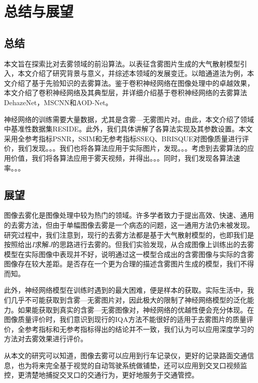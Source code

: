 \documentclass[a4paper, 12pt, oneside]{report}
\begin{document}
{\chapter{总结与展望\quad}
\section{总结\quad}
本文旨在探索比对去雾领域的前沿算法。以表征含雾图片生成的大气散射模型引入，本文介绍了研究背景与意义，并综述本领域的发展变迁。以暗通道法为例，本文介绍了基于先验知识的去雾算法。鉴于卷积神经网络在图像处理中的卓越效果，本文介绍了卷积神经网络及其典型层，并详细介绍基于卷积神经网络的去雾算法DehazeNet，MSCNN和AOD-Net。

神经网络的训练需要大量数据，尤其是含雾—无雾图片对。由此，本文介绍了领域中基准性数据集RESIDE。此外，我们具体讲解了各算法实现及其参数设置。本文采用全参考指标PSNR，SSIM和无参考指标SSEQ、BRISQUE对图像质量进行评价，我们发现。。。我们也将各算法应用于实际图片，发现。。。考虑到去雾算法的应用价值，我们将各算法应用于雾天视频，并得出。。。同时，我们发现各算法速率。。。
	
\section{展望\quad}
图像去雾化是图像处理中较为热门的领域。许多学者致力于提出高效、快速、通用的去雾方法，但由于单幅图像去雾是一个病态的问题，这一通用方法仍未被发现。研究过程中，我们注意到，现行的去雾方法都是基于大气散射模型的，也即我们是按照给出$I$求解$J$的思路进行去雾的。但我们实验发现，从合成图像上训练出的去雾模型在实际图像中表现并不好，说明通过这一模型合成出的含雾图像与实际的含雾图像存在较大差距。是否存在一个更为合理的描述含雾图片生成的模型，我们不得而知。

此外，神经网络模型在训练时遇到的最大困难，便是样本的获取。实际生活中，我们几乎不可能获取到含雾—无雾图片对，因此极大的限制了神经网络模型的泛化能力。如果能获取到真实的含雾—无雾图像对，神经网络的优越性便会充分体现。在图像质量评价时，我们意识到现行的IQA方法不能很好的适用于去雾图片的质量评价，全参考指标和无参考指标得出的结论并不一致，我们认为可以应用深度学习的方法对去雾效果进行评价。

从本文的研究可以知道，图像去雾可以应用到行车记录仪，更好的记录路面交通信息，也为将来完全基于视觉的自动驾驶系统做铺垫，还可以应用到交叉口视频监控，更清楚地捕捉交叉口的交通行为，更好地服务于交通管控。


} %
\end{document}
